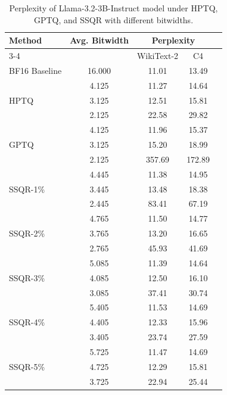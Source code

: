 \documentclass{article} %
\begin{document}
\begin{table}[htpb]
\caption{Perplexity of Llama-3.2-3B-Instruct model under HPTQ, GPTQ, and SSQR with different bitwidths.}
\label{tab:llama3-2_results}
\begin{center}
\begin{tabular}{lcccc}
\toprule
Method & Avg. Bitwidth & \multicolumn{2}{c}{Perplexity}  \\
\cmidrule(r){3-4}
      &           & WikiText-2 & C4 \\
\midrule
BF16 Baseline & 16.000 & 11.01 & 13.49 \\
\midrule
\multirow{3}{*}{HPTQ} & 4.125 & 11.27 & 14.64 \\
           & 3.125 & 12.51 & 15.81 \\
           & 2.125 & 22.58 & 29.82  \\
\midrule
\multirow{3}{*}{GPTQ} & 4.125 & 11.96	& 15.37 \\
           & 3.125 & 15.20	& 18.99 \\
           & 2.125 & 357.69 & 172.89 \\
\midrule
\multirow{3}{*}{SSQR-1\%} & 4.445 & 11.38	& 14.95 \\
           & 3.445 & 13.48 & 18.38 \\
           & 2.445 & 83.41 & 67.19 \\
\midrule
\multirow{3}{*}{SSQR-2\%} & 4.765 & 11.50	& 14.77 \\
           & 3.765 & 13.20 & 16.65 \\
           & 2.765 & 45.93 & 41.69 \\
\midrule
\multirow{3}{*}{SSQR-3\%} & 5.085 & 11.39	& 14.64 \\
           & 4.085 & 12.50 & 16.10 \\
           & 3.085 & 37.41 & 30.74 \\
\midrule
\multirow{3}{*}{SSQR-4\%} & 5.405 & 11.53	& 14.69 \\
           & 4.405 & 12.33 & 15.96 \\
           & 3.405 & 23.74 & 27.59 \\
\midrule
\multirow{3}{*}{SSQR-5\%} & 5.725 & 11.47	& 14.69 \\
           & 4.725 & 12.29 & 15.81 \\
           & 3.725 & 22.94 & 25.44 \\
\bottomrule
\end{tabular}
\end{center}
\end{table}
\end{document}
